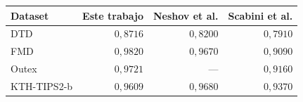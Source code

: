 \begin{resulttable}
\centering\fontsize{8}{10}\selectfont\setlength{\tabcolsep}{3.0pt}
\caption{Comparación descriptiva de exactitud media con BEiTv2 en los datasets compartidos. Este trabajo muestra el mayor promedio externo entre sus configuraciones; los otros valores proceden de Neshov et al. y Scabini et al.}
\label{tab:literature-comparison}
\begin{tabular}{@{}lrrr@{}}
\toprule
Dataset & Este trabajo & Neshov et al. & Scabini et al. \\
\midrule
DTD & $0{,}8716$ & $0{,}8200$ & $0{,}7910$ \\
FMD & $0{,}9820$ & $0{,}9670$ & $0{,}9090$ \\
Outex & $0{,}9721$ & --- & $0{,}9160$ \\
KTH-TIPS2-b & $0{,}9609$ & $0{,}9680$ & $0{,}9370$ \\
\bottomrule
\end{tabular}
\par{}
\end{resulttable}
\FloatBarrier
